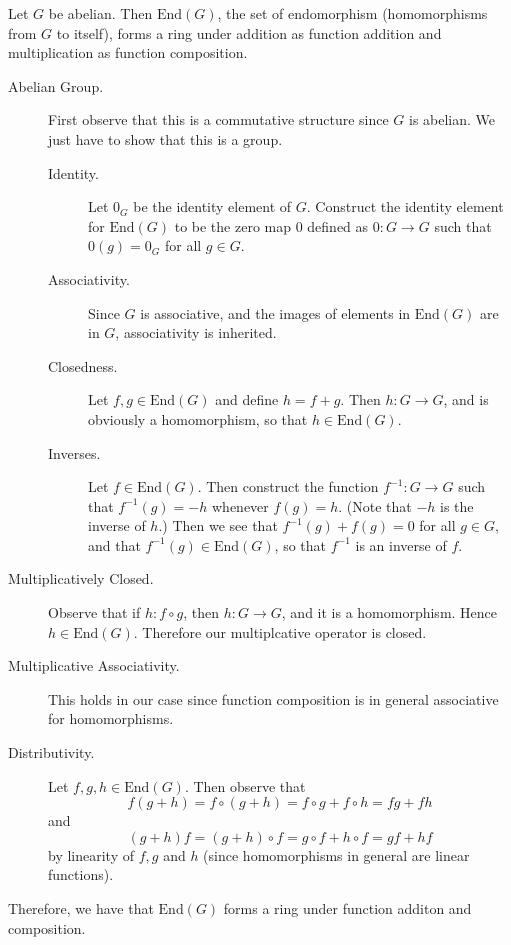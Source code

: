     \textcolor{Purple!80!White}{Let $G$ be abelian. Then $\mbox{End}(G)$, the set of
    endomorphism (homomorphisms from $G$ to itself), forms a
    ring under addition as function addition and multiplication as
    function composition.} 
    \begin{description}
        \item[Abelian Group.] First observe that this is a
        commutative structure since $G$ is abelian. We just have
        to show that this is a group.
        \begin{description}
            \item[Identity.] Let $0_G$ be the identity element of
            $G$. Construct the identity element for $\mbox{End}(G)$ to
            be the zero map $0$
            defined as $0: G \to G$ such that $0(g) = 0_G$ for all
            $g \in G$. 

            \item[Associativity.] Since $G$ is associative, and
            the images of elements in $\mbox{End}(G)$ are in $G$,
            associativity is inherited. 

            \item[Closedness.] Let $f, g \in \mbox{End}(G)$ and
            define $h = f + g$. Then $h: G \to G$, and is
            obviously a homomorphism, so that $h \in
            \mbox{End}(G)$. 

            \item[Inverses.] Let $f \in \mbox{End}(G)$. Then
            construct the function $f^{-1} : G 
            \to G$ such that $f^{-1}(g) = -h$ whenever $f(g) =
            h$. (Note that $-h$ is the inverse of $h$.) Then we
            see that $f^{-1}(g) + f(g) = 0$ for all $g \in G$, and
            that $f^{-1}(g) \in \mbox{End}(G)$, so that $f^{-1}$
            is an inverse of $f$. 
        \end{description}

        \item[Multiplicatively Closed.] Observe that if $h: f
        \circ g$, then $h: G \to G$, and it is a homomorphism.
        Hence $h \in \mbox{End}(G)$.
        Therefore our multiplcative operator is closed.

        \item[Multiplicative Associativity.] This holds in our
        case since function composition is in general associative
        for homomorphisms.

        \item[Distributivity.] Let $f, g, h \in \mbox{End}(G)$.
        Then observe that 
        \[
            f(g + h) = f \circ (g + h) = f \circ g + f \circ h = fg + fh
        \]
        and 
        \[
            (g + h)f = (g + h) \circ f = g \circ f + h \circ f = gf + hf
        \]
        by linearity of $f, g$ and $h$ (since homomorphisms in
        general are linear functions).
    \end{description}
    Therefore, we have that $\mbox{End}(G)$ forms a ring under
    function additon and composition.
    \\

